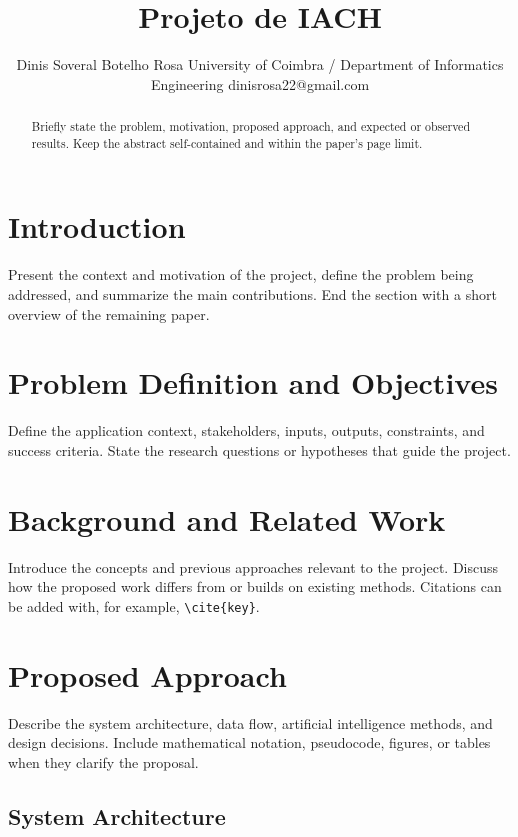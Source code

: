\documentclass{article}
\title{Projeto de IACH}
\author{
    Dinis Soveral Botelho Rosa
    \affiliations
    University of Coimbra / Department of Informatics Engineering
    \emails
    dinisrosa22@gmail.com
}
\begin{document}
\maketitle

\begin{abstract}
Briefly state the problem, motivation, proposed approach, and expected or
observed results. Keep the abstract self-contained and within the paper's
page limit.
\end{abstract}

\section{Introduction}
\label{sec:introduction}

Present the context and motivation of the project, define the problem being
addressed, and summarize the main contributions. End the section with a short
overview of the remaining paper.

\section{Problem Definition and Objectives}
\label{sec:problem}

Define the application context, stakeholders, inputs, outputs, constraints,
and success criteria. State the research questions or hypotheses that guide
the project.

\section{Background and Related Work}
\label{sec:related-work}

Introduce the concepts and previous approaches relevant to the project.
Discuss how the proposed work differs from or builds on existing methods.
Citations can be added with, for example, \verb|\cite{key}|.

\section{Proposed Approach}
\label{sec:approach}

Describe the system architecture, data flow, artificial intelligence methods,
and design decisions. Include mathematical notation, pseudocode, figures, or
tables when they clarify the proposal.

\subsection{System Architecture}
\label{sec:architecture}
\end{document}
